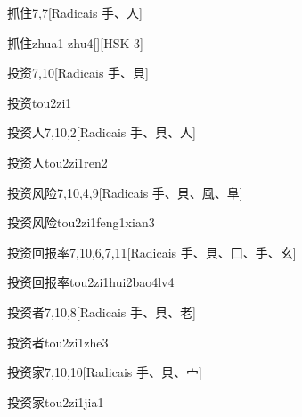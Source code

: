 \begin{entry}{抓住}{7,7}[Radicais ⼿、⼈]
  \begin{phonetics}{抓住}{zhua1 zhu4}[][HSK 3]
  \end{phonetics}
\end{entry}

\begin{entry}{投资}{7,10}[Radicais ⼿、⾙]
  \begin{phonetics}{投资}{tou2zi1}
  \end{phonetics}
\end{entry}

\begin{entry}{投资人}{7,10,2}[Radicais ⼿、⾙、⼈]
  \begin{phonetics}{投资人}{tou2zi1ren2}
  \end{phonetics}
\end{entry}

\begin{entry}{投资风险}{7,10,4,9}[Radicais ⼿、⾙、⾵、⾩]
  \begin{phonetics}{投资风险}{tou2zi1feng1xian3}
  \end{phonetics}
\end{entry}

\begin{entry}{投资回报率}{7,10,6,7,11}[Radicais ⼿、⾙、⼞、⼿、⽞]
  \begin{phonetics}{投资回报率}{tou2zi1hui2bao4lv4}
  \end{phonetics}
\end{entry}

\begin{entry}{投资者}{7,10,8}[Radicais ⼿、⾙、⽼]
  \begin{phonetics}{投资者}{tou2zi1zhe3}
  \end{phonetics}
\end{entry}

\begin{entry}{投资家}{7,10,10}[Radicais ⼿、⾙、⼧]
  \begin{phonetics}{投资家}{tou2zi1jia1}
  \end{phonetics}
\end{entry}

